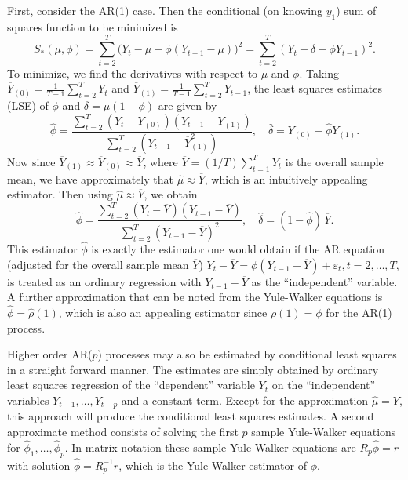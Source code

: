 First, consider the AR(1) case. Then the conditional (on knowing $y_1$) sum of squares function to be minimized is
	\[
	S_*(\mu,\phi) = \sum_{t=2}^T \big(Y_t - \mu - \phi(Y_{t-1} - \mu) \big)^2 = \sum_{t=2}^T (Y_t - \delta - \phi Y_{t-1})^2.
	\]
To minimize, we find the derivatives with respect to $\mu$ and $\phi$. Taking $\overline{Y}_{(0)} = \frac{1}{T-1} \sum_{t=2}^T Y_t$ and $\overline{Y}_{(1)} = \frac{1}{T-1} \sum_{t=2}^T Y_{t-1}$, the least squares estimates (LSE) of $\phi$ and $\delta = \mu(1 - \phi)$ are given by
	\[
	\hat{\phi} = \dfrac{\sum_{t=2}^T ( Y_t - \overline{Y}_{(0)} ) (Y_{t-1} - \overline{Y}_{(1)} )}{\sum_{t=2}^T ( Y_{t-1} - \overline{Y}_{(1)}^2 )} ,  \quad \hat{\delta} = \overline{Y}_{(0)} - \hat{\phi}\overline{Y}_{(1)}.
	\]
Now since $\overline{Y}_{(1)} \approx \overline{Y}_{(0)} \approx \overline{Y}$, where $\overline{Y} = (1/T) \sum_{t=1}^T Y_t$ is the overall sample mean, we have approximately that $\hat{\mu} \approx \overline{Y}$, which is an intuitively appealing estimator. Then using $\hat{\mu} \approx \overline{Y}$, we obtain
	\begin{equation} \label{eqn:anotherhatphi}
	\hat{\phi} = \frac{\sum_{t=2}^T(Y_t - \overline{Y}) (Y_{t-1} - \overline{Y} )}{\sum_{t=2}^T (Y_{t-1} - \overline{Y})^2}, \quad \hat{\delta}= (1-\hat{\phi}) \, \overline{Y}.
	\end{equation}
This estimator $\hat{\phi}$ is exactly the estimator one would obtain if the AR equation (adjusted for the overall sample mean $\overline{Y}$) $Y_t - \overline{Y} = \phi(Y_{t-1} - \overline{Y}) + \varepsilon_t, t = 2, \ldots, T$, is treated as an ordinary regression with $Y_{t-1} - \overline{Y}$ as the ``independent'' variable. A further approximation that can be noted from the Yule-Walker equations is $\hat{\phi}= \hat{\rho}(1)$, which is also an appealing estimator since $\rho(1) = \phi$ for the AR(1) process. 


Higher order AR($p$) processes may also be estimated by conditional least squares in a straight forward manner. The estimates are simply obtained by ordinary least squares regression of the ``dependent'' variable $Y_t$ on the ``independent'' variables $Y_{t-1}, \ldots, Y_{t-p}$ and a constant term. Except for the approximation $\hat{\mu} = \overline{Y}$, this approach will produce the conditional least squares estimates. A second approximate method consists of solving the first $p$ sample Yule-Walker equations for $\hat{\phi}_1, \ldots, \hat{\phi}_p$. In matrix notation these sample Yule-Walker equations are $R_p\hat{\phi} = r$ with solution $\hat{\phi} = R_p^{-1} r$, which is the Yule-Walker estimator of $\phi$.


